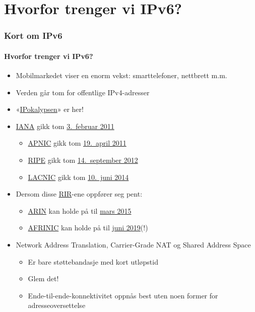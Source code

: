 \section{Hvorfor trenger vi IPv6?}
\begin{frame}%
  \frametitle{Kort om IPv6}
  \framesubtitle{Hvorfor trenger vi IPv6?}
  \pause
  \begin{itemize}[<+->]
  \item Mobilmarkedet viser en enorm vekst: smarttelefoner, nettbrett m.m.
  \item Verden går tom for offentlige IPv4-adresser
  \item
    «\href{http://www.potaroo.net/presentations/2012-05-22-terena.pdf}{IPokalypsen}»
    er her!
  \item \href{http://www.iana.org/}{IANA} gikk tom
    \href{http://www.icann.org/en/news/press/releases/release-03feb11-en.pdf}{3.~februar
      2011}
    \begin{itemize}[<+->]
    \item \href{http://www.apnic.net/}{APNIC} gikk tom
      \href{http://www.apnic.net/community/ipv4-exhaustion/graphical-information}{19.~april
        2011}
    \item \href{http://www.ripe.net/}{RIPE} gikk tom
      \href{http://www.ripe.net/internet-coordination/ipv4-exhaustion}{14.~september
        2012}
    \item \href{http://www.lacnic.net/en/web/lacnic/inicio}{LACNIC}
      gikk tom
      \href{http://www.lacnic.net/en/web/lacnic/agotamiento-ipv4}{10.~juni
        2014}
    \end{itemize}
  \item Dersom disse
    \href{http://en.wikipedia.org/wiki/Regional_Internet_registry}{RIR}-ene
    oppfører seg pent:
    \begin{itemize}
    \item \href{https://www.arin.net/}{ARIN} kan holde på til
      \href{http://www.potaroo.net/tools/ipv4/}{mars 2015}
    \item \href{http://www.afrinic.net/}{AFRINIC} kan holde på til
      \href{http://www.potaroo.net/tools/ipv4/}{juni 2019}(!)
    \end{itemize}
  \item Network Address Translation, Carrier-Grade NAT og Shared
    Address Space
    \begin{itemize}[<+->]
    \item Er bare støttebandasje med kort utløpstid
    \item Glem det!
    \item Ende-til-ende-konnektivitet oppnås best uten noen former for
      adresseoversettelse
    \end{itemize}
  \end{itemize}
\end{frame}

